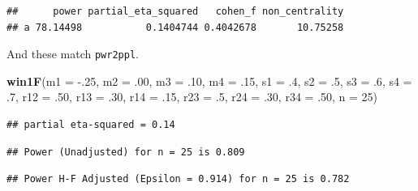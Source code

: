 \documentclass[
]{book}
\newenvironment{Shaded}{\begin{snugshade}}{\end{snugshade}}
\newcommand{\DataTypeTok}[1]{\textcolor[rgb]{0.13,0.29,0.53}{#1}}
\newcommand{\DecValTok}[1]{\textcolor[rgb]{0.00,0.00,0.81}{#1}}
\newcommand{\FloatTok}[1]{\textcolor[rgb]{0.00,0.00,0.81}{#1}}
\newcommand{\KeywordTok}[1]{\textcolor[rgb]{0.13,0.29,0.53}{\textbf{#1}}}
\newcommand{\NormalTok}[1]{#1}
\newcommand{\OperatorTok}[1]{\textcolor[rgb]{0.81,0.36,0.00}{\textbf{#1}}}
\newcommand{\OtherTok}[1]{\textcolor[rgb]{0.56,0.35,0.01}{#1}}
\newcommand{\StringTok}[1]{\textcolor[rgb]{0.31,0.60,0.02}{#1}}
\begin{document}
\begin{Shaded}
\end{Shaded}

\begin{verbatim}
##      power partial_eta_squared   cohen_f non_centrality
## a 78.14498           0.1404744 0.4042678       10.75258
\end{verbatim}

And these match \texttt{pwr2ppl}.

\begin{Shaded}
\begin{Highlighting}[]
\KeywordTok{win1F}\NormalTok{(}\DataTypeTok{m1 =} \FloatTok{-.25}\NormalTok{, }\DataTypeTok{m2 =} \FloatTok{.00}\NormalTok{, }\DataTypeTok{m3 =} \FloatTok{.10}\NormalTok{, }\DataTypeTok{m4 =} \FloatTok{.15}\NormalTok{,}
      \DataTypeTok{s1 =} \FloatTok{.4}\NormalTok{, }\DataTypeTok{s2 =} \FloatTok{.5}\NormalTok{, }\DataTypeTok{s3 =} \FloatTok{.6}\NormalTok{, }\DataTypeTok{s4 =} \FloatTok{.7}\NormalTok{,}
      \DataTypeTok{r12 =} \FloatTok{.50}\NormalTok{, }\DataTypeTok{r13 =} \FloatTok{.30}\NormalTok{,}
      \DataTypeTok{r14 =} \FloatTok{.15}\NormalTok{, }\DataTypeTok{r23 =} \FloatTok{.5}\NormalTok{,}
      \DataTypeTok{r24 =} \FloatTok{.30}\NormalTok{, }\DataTypeTok{r34 =} \FloatTok{.50}\NormalTok{,}
      \DataTypeTok{n =} \DecValTok{25}\NormalTok{)}
\end{Highlighting}
\end{Shaded}

\begin{verbatim}
## partial eta-squared = 0.14
\end{verbatim}

\begin{verbatim}
## Power (Unadjusted) for n = 25 is 0.809
\end{verbatim}

\begin{verbatim}
## Power H-F Adjusted (Epsilon = 0.914) for n = 25 is 0.782
\end{verbatim}
\end{document}
